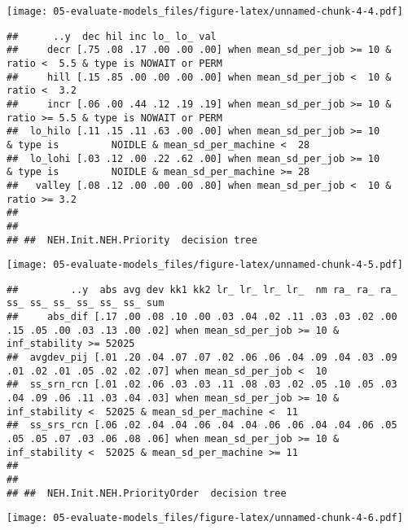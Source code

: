 \documentclass[
]{article}
\begin{document}
\texttt{[image: 05-evaluate-models\_files/figure-latex/unnamed-chunk-4-4.pdf]}

\begin{verbatim}
##      ..y  dec hil inc lo_ lo_ val                                                                                                
##     decr [.75 .08 .17 .00 .00 .00] when mean_sd_per_job >= 10 & ratio <  5.5 & type is NOWAIT or PERM                            
##     hill [.15 .85 .00 .00 .00 .00] when mean_sd_per_job <  10 & ratio <  3.2                                                     
##     incr [.06 .00 .44 .12 .19 .19] when mean_sd_per_job >= 10 & ratio >= 5.5 & type is NOWAIT or PERM                            
##  lo_hilo [.11 .15 .11 .63 .00 .00] when mean_sd_per_job >= 10                & type is         NOIDLE & mean_sd_per_machine <  28
##  lo_lohi [.03 .12 .00 .22 .62 .00] when mean_sd_per_job >= 10                & type is         NOIDLE & mean_sd_per_machine >= 28
##   valley [.08 .12 .00 .00 .00 .80] when mean_sd_per_job <  10 & ratio >= 3.2                                                     
## 
## 
## ##  NEH.Init.NEH.Priority  decision tree
\end{verbatim}

\texttt{[image: 05-evaluate-models\_files/figure-latex/unnamed-chunk-4-5.pdf]}

\begin{verbatim}
##         ..y  abs avg dev kk1 kk2 lr_ lr_ lr_ lr_  nm ra_ ra_ ra_ ss_ ss_ ss_ ss_ ss_ ss_ sum                                                                                 
##     abs_dif [.17 .00 .08 .10 .00 .03 .04 .02 .11 .03 .03 .02 .00 .15 .05 .00 .03 .13 .00 .02] when mean_sd_per_job >= 10 & inf_stability >= 52025                            
##  avgdev_pij [.01 .20 .04 .07 .07 .02 .06 .06 .04 .09 .04 .03 .09 .01 .02 .01 .05 .02 .02 .07] when mean_sd_per_job <  10                                                     
##  ss_srn_rcn [.01 .02 .06 .03 .03 .11 .08 .03 .02 .05 .10 .05 .03 .04 .09 .06 .11 .03 .04 .03] when mean_sd_per_job >= 10 & inf_stability <  52025 & mean_sd_per_machine <  11
##  ss_srs_rcn [.06 .02 .04 .04 .06 .04 .04 .06 .06 .04 .04 .06 .05 .05 .05 .07 .03 .06 .08 .06] when mean_sd_per_job >= 10 & inf_stability <  52025 & mean_sd_per_machine >= 11
## 
## 
## ##  NEH.Init.NEH.PriorityOrder  decision tree
\end{verbatim}

\texttt{[image: 05-evaluate-models\_files/figure-latex/unnamed-chunk-4-6.pdf]}
\end{document}
